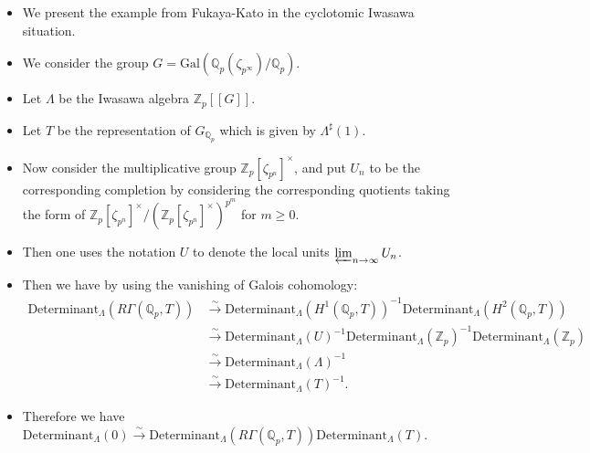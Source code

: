 \documentclass[11pt]{report}
\begin{document}

\begin{itemize}
\item<1-> We present the example from Fukaya-Kato \cite[Example 3.6]{FK} in the cyclotomic Iwasawa situation. 
\item<2-> We consider the group $G=\mathrm{Gal}(\mathbb{Q}_p(\zeta_{p^\infty})/\mathbb{Q}_p)$.
\item<3-> Let $\Lambda$ be the Iwasawa algebra $\mathbb{Z}_p[[G]]$.
\item<4-> Let $T$ be the representation of $G_{\mathbb{Q}_p}$ which is given by $\Lambda^{\sharp}(1)$.
\item<5-> Now consider the multiplicative group $\mathbb{Z}_p[\zeta_{p^n}]^\times$, and put $U_n$ to be the corresponding completion by considering the corresponding quotients taking the form of $\mathbb{Z}_p[\zeta_{p^n}]^\times/(\mathbb{Z}_p[\zeta_{p^n}]^\times)^{p^m}$ for $m\geq 0$.
\item<6-> Then one uses the notation $U$ to denote the local units $\varprojlim_{n\rightarrow \infty}U_n$.
\item<7-> Then we have by using the vanishing of Galois cohomology:
\begin{align}
\mathrm{Determinant}_\Lambda(R\Gamma(\mathbb{Q}_p,T))&\overset{\sim}{\longrightarrow}\mathrm{Determinant}_\Lambda(H^1(\mathbb{Q}_p,T))^{-1}\mathrm{Determinant}_\Lambda(H^2(\mathbb{Q}_p,T))\\
&	\overset{\sim}{\longrightarrow}\mathrm{Determinant}_\Lambda(U)^{-1}\mathrm{Determinant}_\Lambda(\mathbb{Z}_p)^{-1}\mathrm{Determinant}_\Lambda(\mathbb{Z}_p)\\
&\overset{\sim}{\longrightarrow}\mathrm{Determinant}_\Lambda(\Lambda)^{-1}\\
&\overset{\sim}{\longrightarrow}\mathrm{Determinant}_\Lambda(T)^{-1}.
\end{align}
\item<8-> Therefore we have $\mathrm{Determinant}_\Lambda(0)\overset{\sim}{\rightarrow} \mathrm{Determinant}_\Lambda(R\Gamma(\mathbb{Q}_p,T))\mathrm{Determinant}_\Lambda(T)$.

	
\end{itemize}
\end{document}
